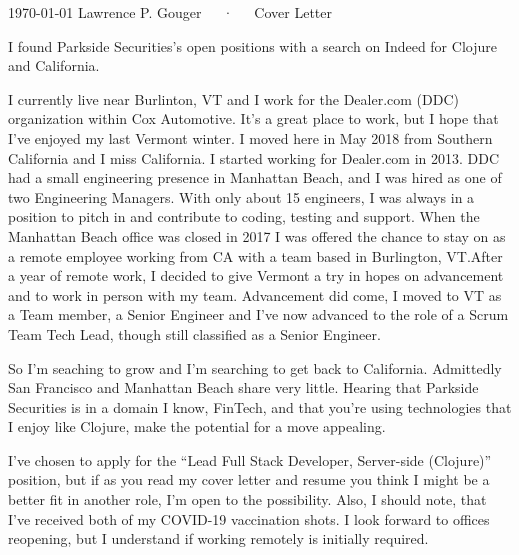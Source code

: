 \documentclass[11pt, letterpaper]{awesome-cv}
\begin{document}
\makecvheader[R]

\makecvfooter
  {\today}
  {Lawrence P. Gouger~~~·~~~Cover Letter}
  {}

\makelettertitle

\begin{cvletter}

I found Parkside Securities's open positions with a search on Indeed
for Clojure and California.

I currently live near Burlinton, VT and I work for the Dealer.com (DDC)
organization within Cox Automotive.  It's a great place to work, but I
hope that I've enjoyed my last Vermont winter.  I moved here in May
2018 from Southern California and I miss California.  I started
working for Dealer.com in 2013.  DDC had a small engineering
presence in Manhattan Beach, and I was hired as one of two Engineering
Managers.  With only about 15 engineers, I was always in a position to
pitch in and contribute to coding, testing and support.  When the
Manhattan Beach office was closed in 2017 I was offered the chance to
stay on as a remote employee working from CA with a team based in
Burlington, VT.\@ After a year of remote work, I decided to give
Vermont a try in hopes on advancement and to work in person with my
team.  Advancement did come, I moved to VT as a Team member, a Senior
Engineer and I've now advanced to the role of a Scrum Team Tech Lead,
though still classified as a Senior Engineer.

So I'm seaching to grow and I'm searching to get back to California.
Admittedly San Francisco and Manhattan Beach share very little.
Hearing that Parkside Securities is in a domain I know, FinTech, and
that you're using technologies that I enjoy like Clojure, make the
potential for a move appealing.

I've chosen to apply for the ``Lead Full Stack Developer, Server-side
(Clojure)'' position, but if as you read my cover letter and resume
you think I might be a better fit in another role, I'm open to the
possibility.  Also, I should note, that I've received both of my
COVID-19 vaccination shots.  I look forward to offices reopening, but
I understand if working remotely is initially required.


\end{cvletter}
\end{document}
